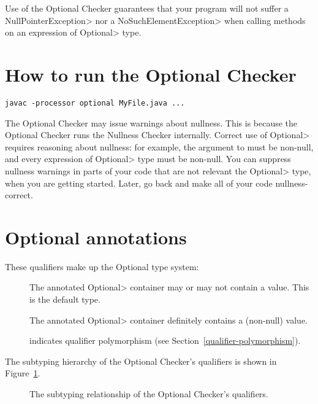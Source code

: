 Use of the Optional Checker guarantees that your program will not suffer a
\<NullPointerException> nor a \<NoSuchElementException> when calling
methods on an expression of \<Optional> type.


\section{How to run the Optional Checker\label{optional-run-checker}}

\begin{Verbatim}
javac -processor optional MyFile.java ...
\end{Verbatim}

The Optional Checker may issue warnings about nullness.
This is because the Optional Checker runs the Nullness Checker internally.
Correct use of \<Optional> requires reasoning about nullness:  for
example, the argument to
must be non-null, and every expression of \<Optional> type must be
non-null.
You can suppress nullness warnings in parts of your code that are not
relevant the \<Optional> type, when you are getting started.  Later, go
back and make all of your code nullness-correct.


\section{Optional annotations\label{optional-annotations}}

These qualifiers make up the Optional type system:

\begin{description}

\item[]
  The annotated \<Optional> container may or may not contain a value.
  This is the default type.

\item[]
  The annotated \<Optional> container definitely contains a (non-null) value.

\item[]
  indicates qualifier polymorphism (see Section~\ref{qualifier-polymorphism}).

\end{description}

The subtyping hierarchy of the Optional Checker's qualifiers is shown in
Figure~\ref{fig-optional-hierarchy}.

\begin{figure}
\caption{The subtyping relationship of the Optional Checker's qualifiers.}
\label{fig-optional-hierarchy}
\end{figure}

